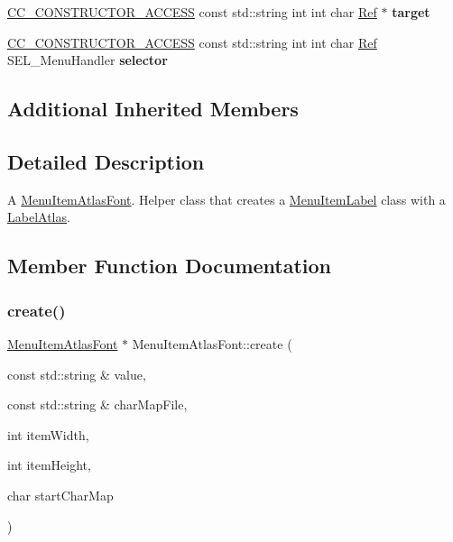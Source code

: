 \begin{DoxyCompactItemize}
\hyperlink{_2cocos2d_2cocos_2base_2ccConfig_8h_a25ef1314f97c35a2ed3d029b0ead6da0}{C\+C\+\_\+\+C\+O\+N\+S\+T\+R\+U\+C\+T\+O\+R\+\_\+\+A\+C\+C\+E\+SS} const std\+::string int int char \hyperlink{classRef}{Ref} $\ast$ {\bfseries target}
\item 
\mbox{\label{classMenuItemAtlasFont_abb6c46bb4f357c445fbf988b23712e62}} 
\hyperlink{_2cocos2d_2cocos_2base_2ccConfig_8h_a25ef1314f97c35a2ed3d029b0ead6da0}{C\+C\+\_\+\+C\+O\+N\+S\+T\+R\+U\+C\+T\+O\+R\+\_\+\+A\+C\+C\+E\+SS} const std\+::string int int char \hyperlink{classRef}{Ref} S\+E\+L\+\_\+\+Menu\+Handler {\bfseries selector}
\end{DoxyCompactItemize}
\subsection*{Additional Inherited Members}


\subsection{Detailed Description}
A \hyperlink{classMenuItemAtlasFont}{Menu\+Item\+Atlas\+Font}. Helper class that creates a \hyperlink{classMenuItemLabel}{Menu\+Item\+Label} class with a \hyperlink{classLabelAtlas}{Label\+Atlas}. 

\subsection{Member Function Documentation}
\mbox{\label{classMenuItemAtlasFont_acdfab9e60981134f2905bb6bc4dc592d}} 
\subsubsection{\texorpdfstring{create()}{create()}\hspace{0.1cm}{\footnotesize\ttfamily [1/6]}}
{\footnotesize\ttfamily \hyperlink{classMenuItemAtlasFont}{Menu\+Item\+Atlas\+Font} $\ast$ Menu\+Item\+Atlas\+Font\+::create (\begin{DoxyParamCaption}\item[{const std\+::string \&}]{value,  }\item[{const std\+::string \&}]{char\+Map\+File,  }\item[{int}]{item\+Width,  }\item[{int}]{item\+Height,  }\item[{char}]{start\+Char\+Map }\end{DoxyParamCaption})\hspace{0.3cm}{\ttfamily [static]}}

